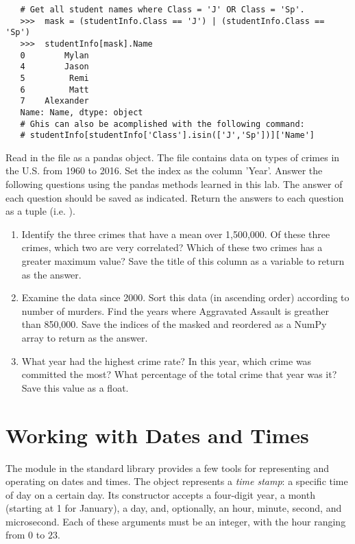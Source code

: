 \begin{lstlisting}
   # Get all student names where Class = 'J' OR Class = 'Sp'.
   >>>  mask = (studentInfo.Class == 'J') | (studentInfo.Class == 'Sp')
   >>>  studentInfo[mask].Name
   0        Mylan
   4        Jason
   5         Remi
   6         Matt
   7    Alexander
   Name: Name, dtype: object
   # Ghis can also be acomplished with the following command:
   # studentInfo[studentInfo['Class'].isin(['J','Sp'])]['Name']
\end{lstlisting}

\begin{problem}\label{prob:rate}
Read in the file  as a pandas object.
The file contains data on types of crimes in the U.S. from 1960 to 2016.
Set the index as the column 'Year'.
Answer the following questions using the pandas methods learned in this lab.
The answer of each question should be saved as indicated.
Return the answers to each question as a tuple (i.e. ).

\begin{enumerate}
	\item Identify the three crimes that have a mean over 1,500,000. 
	Of these three crimes, which two are very correlated? 
	Which of these two crimes has a greater maximum value?
	Save the title of this column as a variable to return as the answer.
	\item Examine the data since 2000.
	Sort this data (in ascending order) according to number of murders.
	Find the years where Aggravated Assault is greather than 850,000.
   Save the indices of the masked and reordered  as a NumPy array to return as the answer.
	\item What year had the highest crime rate? 
	In this year, which crime was committed the most? 
	What percentage of the total crime that year was it? 
	Save this value as a float.
\end{enumerate}
\end{problem}


\section*{Working with Dates and Times} %

The  module in the standard library provides a few tools for representing and operating on dates and times.
The  object represents a \emph{time stamp}: a specific time of day on a certain day.
Its constructor accepts a four-digit year, a month (starting at 1 for January), a day, and, optionally, an hour, minute, second, and microsecond.
Each of these arguments must be an integer, with the hour ranging from $0$ to $23$.


